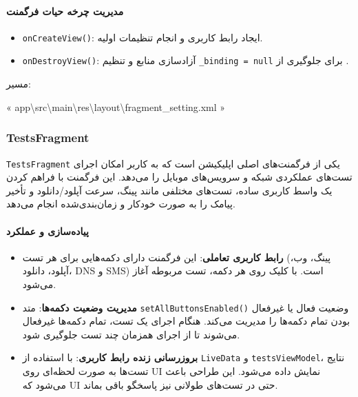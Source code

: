 \documentclass{report}
\begin{document}
\paragraph{مدیریت چرخه حیات فرگمنت}

\begin{itemize}
	\item \texttt{onCreateView()}: ایجاد رابط کاربری و انجام تنظیمات اولیه.
	\item \texttt{onDestroyView()}: آزادسازی منابع و تنظیم \texttt{\_binding = null} برای جلوگیری از .
\end{itemize}

\begin{note}{مسیر:}
	\begin{latin}
		« app\textbackslash src\textbackslash main\textbackslash res\textbackslash layout\textbackslash fragment\_setting.xml »
	\end{latin}
\end{note}
\subsubsection{TestsFragment}

\texttt{TestsFragment} یکی از فرگمنت‌های اصلی اپلیکیشن است که به کاربر امکان اجرای تست‌های عملکردی شبکه و سرویس‌های موبایل را می‌دهد. 
این فرگمنت با فراهم کردن یک واسط کاربری ساده، تست‌های مختلفی مانند پینگ، سرعت آپلود/دانلود و تأخیر پیامک را به صورت خودکار و زمان‌بندی‌شده انجام می‌دهد.

\paragraph{پیاده‌سازی و عملکرد}

\begin{itemize}
	\item \textbf{رابط کاربری تعاملی}: این فرگمنت دارای دکمه‌هایی برای هر تست (پینگ، وب، آپلود، دانلود، DNS و SMS) است. با کلیک روی هر دکمه، تست مربوطه آغاز می‌شود.
	\item \textbf{مدیریت وضعیت دکمه‌ها}: متد \texttt{setAllButtonsEnabled()} وضعیت فعال یا غیرفعال بودن تمام دکمه‌ها را مدیریت می‌کند. هنگام اجرای یک تست، تمام دکمه‌ها غیرفعال می‌شوند تا از اجرای همزمان چند تست جلوگیری شود.
	\item \textbf{بروزرسانی زنده رابط کاربری}: با استفاده از \texttt{LiveData} و \texttt{testsViewModel}، نتایج تست‌ها به صورت لحظه‌ای روی UI نمایش داده می‌شود. این طراحی باعث می‌شود که UI حتی در تست‌های طولانی نیز پاسخگو باقی بماند.
\end{itemize}
\end{document}
